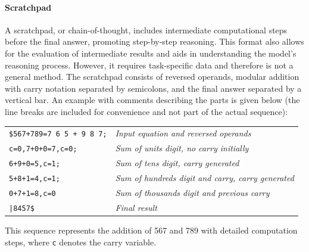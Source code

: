 \paragraph{Scratchpad}
A scratchpad, or chain-of-thought, includes intermediate computational steps before the final answer, promoting step-by-step reasoning. This format also allows for the evaluation of intermediate results and aids in understanding the model's reasoning process. However, it requires task-specific data and therefore is not a general method. The scratchpad consists of reversed operands, modular addition with carry notation separated by semicolons, and the final answer separated by a vertical bar. An example with comments describing the parts is given below (the line breaks are included for convenience and not part of the actual sequence):
\begin{center}
    \begin{tabular}{l l}
        \verb|$567+789=7 6 5 + 9 8 7;| & \textit{Input equation and reversed operands}             \\
        \verb|c=0,7+0+0=7,c=0;|        & \textit{Sum of units digit, no carry initially}           \\
        \verb|6+9+0=5,c=1;|            & \textit{Sum of tens digit, carry generated}               \\
        \verb|5+8+1=4,c=1;|            & \textit{Sum of hundreds digit and carry, carry generated} \\
        \verb|0+7+1=8,c=0|             & \textit{Sum of thousands digit and previous carry}        \\
        \texttt{|8457\$}               & \textit{Final result}
    \end{tabular}
\end{center}

This sequence represents the addition of 567 and 789 with detailed computation steps, where \texttt{c} denotes the carry variable.


